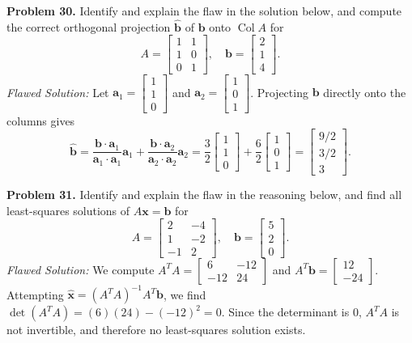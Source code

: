 \documentclass[11pt, letterpaper]{article}
\theoremstyle{definition}
\theoremstyle{remark}
\begin{document}
\textbf{Problem 30.} Identify and explain the flaw in the solution below, and compute the correct orthogonal projection $\hat{\mathbf{b}}$ of $\mathbf{b}$ onto $\operatorname{Col} A$ for
\[
A = \begin{bmatrix} 1 & 1 \\ 1 & 0 \\ 0 & 1 \end{bmatrix}, \quad \mathbf{b} = \begin{bmatrix} 2 \\ 1 \\ 4 \end{bmatrix}.
\]
\textit{Flawed Solution:} Let $\mathbf{a}_1 = \begin{bmatrix} 1 \\ 1 \\ 0 \end{bmatrix}$ and $\mathbf{a}_2 = \begin{bmatrix} 1 \\ 0 \\ 1 \end{bmatrix}$. Projecting $\mathbf{b}$ directly onto the columns gives
\[
\hat{\mathbf{b}} = \frac{\mathbf{b} \cdot \mathbf{a}_1}{\mathbf{a}_1 \cdot \mathbf{a}_1} \mathbf{a}_1 + \frac{\mathbf{b} \cdot \mathbf{a}_2}{\mathbf{a}_2 \cdot \mathbf{a}_2} \mathbf{a}_2 = \frac{3}{2} \begin{bmatrix} 1 \\ 1 \\ 0 \end{bmatrix} + \frac{6}{2} \begin{bmatrix} 1 \\ 0 \\ 1 \end{bmatrix} = \begin{bmatrix} 9/2 \\ 3/2 \\ 3 \end{bmatrix}.
\]

\textbf{Problem 31.} Identify and explain the flaw in the reasoning below, and find all least-squares solutions of $A\mathbf{x} = \mathbf{b}$ for
\[
A = \begin{bmatrix} 2 & -4 \\ 1 & -2 \\ -1 & 2 \end{bmatrix}, \quad \mathbf{b} = \begin{bmatrix} 5 \\ 2 \\ 0 \end{bmatrix}.
\]
\textit{Flawed Solution:} We compute $A^T A = \begin{bmatrix} 6 & -12 \\ -12 & 24 \end{bmatrix}$ and $A^T \mathbf{b} = \begin{bmatrix} 12 \\ -24 \end{bmatrix}$. Attempting $\hat{\mathbf{x}} = (A^T A)^{-1} A^T \mathbf{b}$, we find $\det(A^T A) = (6)(24) - (-12)^2 = 0$. Since the determinant is $0$, $A^T A$ is not invertible, and therefore no least-squares solution exists.
\end{document}
